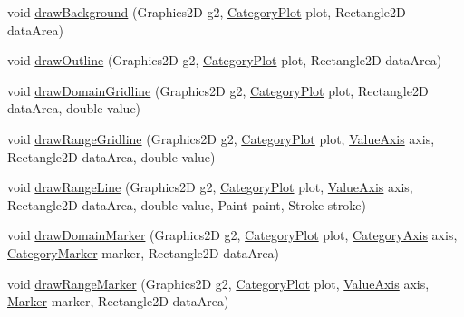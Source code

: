 \begin{DoxyCompactItemize}
\item 
void \mbox{\hyperlink{classorg_1_1jfree_1_1chart_1_1renderer_1_1category_1_1_abstract_category_item_renderer_a361e049bc6eafacf1b6cf705e932d620}{draw\+Background}} (Graphics2D g2, \mbox{\hyperlink{classorg_1_1jfree_1_1chart_1_1plot_1_1_category_plot}{Category\+Plot}} plot, Rectangle2D data\+Area)
\item 
void \mbox{\hyperlink{classorg_1_1jfree_1_1chart_1_1renderer_1_1category_1_1_abstract_category_item_renderer_ad996151ca61f1dff8e2976d68195e88c}{draw\+Outline}} (Graphics2D g2, \mbox{\hyperlink{classorg_1_1jfree_1_1chart_1_1plot_1_1_category_plot}{Category\+Plot}} plot, Rectangle2D data\+Area)
\item 
void \mbox{\hyperlink{classorg_1_1jfree_1_1chart_1_1renderer_1_1category_1_1_abstract_category_item_renderer_af862c6d7da0f1809579302d54396683d}{draw\+Domain\+Gridline}} (Graphics2D g2, \mbox{\hyperlink{classorg_1_1jfree_1_1chart_1_1plot_1_1_category_plot}{Category\+Plot}} plot, Rectangle2D data\+Area, double value)
\item 
void \mbox{\hyperlink{classorg_1_1jfree_1_1chart_1_1renderer_1_1category_1_1_abstract_category_item_renderer_a453a50c55488a841c5a799947d735397}{draw\+Range\+Gridline}} (Graphics2D g2, \mbox{\hyperlink{classorg_1_1jfree_1_1chart_1_1plot_1_1_category_plot}{Category\+Plot}} plot, \mbox{\hyperlink{classorg_1_1jfree_1_1chart_1_1axis_1_1_value_axis}{Value\+Axis}} axis, Rectangle2D data\+Area, double value)
\item 
void \mbox{\hyperlink{classorg_1_1jfree_1_1chart_1_1renderer_1_1category_1_1_abstract_category_item_renderer_ab1bdab3e99aec2fd3bdb89d3be92d208}{draw\+Range\+Line}} (Graphics2D g2, \mbox{\hyperlink{classorg_1_1jfree_1_1chart_1_1plot_1_1_category_plot}{Category\+Plot}} plot, \mbox{\hyperlink{classorg_1_1jfree_1_1chart_1_1axis_1_1_value_axis}{Value\+Axis}} axis, Rectangle2D data\+Area, double value, Paint paint, Stroke stroke)
\item 
void \mbox{\hyperlink{classorg_1_1jfree_1_1chart_1_1renderer_1_1category_1_1_abstract_category_item_renderer_aef7f446c08d3328c8abd9fd45ef891e4}{draw\+Domain\+Marker}} (Graphics2D g2, \mbox{\hyperlink{classorg_1_1jfree_1_1chart_1_1plot_1_1_category_plot}{Category\+Plot}} plot, \mbox{\hyperlink{classorg_1_1jfree_1_1chart_1_1axis_1_1_category_axis}{Category\+Axis}} axis, \mbox{\hyperlink{classorg_1_1jfree_1_1chart_1_1plot_1_1_category_marker}{Category\+Marker}} marker, Rectangle2D data\+Area)
\item 
void \mbox{\hyperlink{classorg_1_1jfree_1_1chart_1_1renderer_1_1category_1_1_abstract_category_item_renderer_ac4e4ae763daff3574fcf206565a3614d}{draw\+Range\+Marker}} (Graphics2D g2, \mbox{\hyperlink{classorg_1_1jfree_1_1chart_1_1plot_1_1_category_plot}{Category\+Plot}} plot, \mbox{\hyperlink{classorg_1_1jfree_1_1chart_1_1axis_1_1_value_axis}{Value\+Axis}} axis, \mbox{\hyperlink{classorg_1_1jfree_1_1chart_1_1plot_1_1_marker}{Marker}} marker, Rectangle2D data\+Area)

\end{DoxyCompactItemize}
